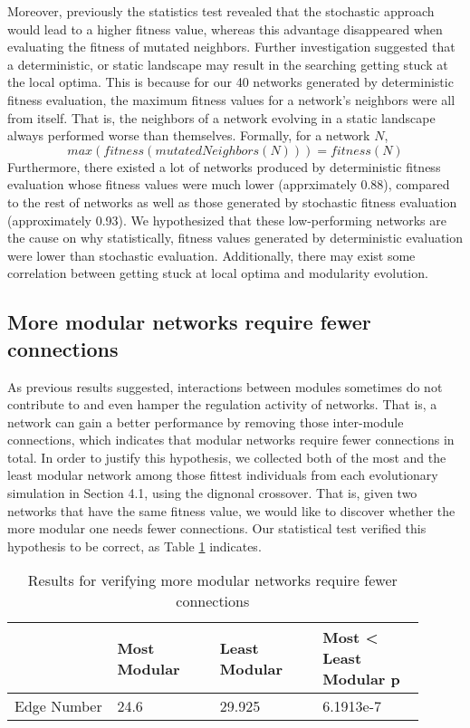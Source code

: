 Moreover, previously the statistics test revealed that the stochastic approach would lead to a higher fitness value, whereas this advantage disappeared when evaluating the fitness of mutated neighbors. Further investigation suggested that a deterministic, or static landscape may result in the searching getting stuck at the local optima. This is because for our 40 networks generated by deterministic fitness evaluation, the maximum fitness values for a network's neighbors were all from itself. That is, the neighbors of a network evolving in a static landscape always performed worse than themselves. Formally, for a network $N$, 
\begin{equation}
max(fitness(mutatedNeighbors(N))) = fitness(N)
\end{equation}
Furthermore, there existed a lot of networks produced by deterministic fitness evaluation whose fitness values were much lower (apprximately 0.88), compared to the rest of networks as well as those generated by stochastic fitness evaluation (approximately 0.93). We hypothesized that these low-performing networks are the cause on why statistically, fitness values generated by deterministic evaluation were lower than stochastic evaluation. Additionally, there may exist some correlation between getting stuck at local optima and modularity evolution. 

\subsection{More modular networks require fewer connections}
As previous results suggested, interactions between modules sometimes do not contribute to and even hamper the regulation activity of networks. That is, a network can gain a better performance by removing those inter-module connections, which indicates that modular networks require fewer connections in total. In order to justify this hypothesis, we collected both of the most and the least modular network among those fittest individuals from each evolutionary simulation in Section 4.1, using the dignonal crossover. That is, given two networks that have the same fitness value, we would like to discover whether the more modular one needs fewer connections. Our statistical test verified this hypothesis to be correct, as Table \ref{table:4.14} indicates. 
\begin{table}[h]
	\centering
	\caption{Results for verifying more modular networks require fewer connections}
	\label{table:4.14}
	\begin{tabular}{| p{0.225\linewidth}  | p{0.225\linewidth}  | p{0.225\linewidth} | p{0.225\linewidth} |} 
		\hline
		& Most Modular & Least Modular & Most < Least Modular p\\
		\hline
		Edge Number & 24.6 & 29.925 & 6.1913e-7\\ 
		\hline
	\end{tabular}
\end{table}


